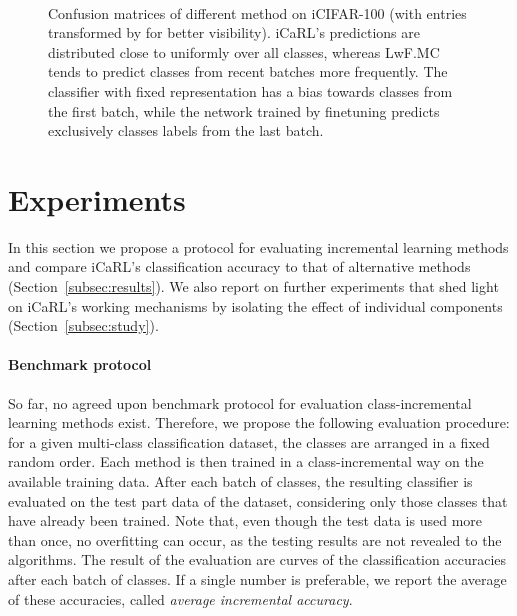 \documentclass[10pt,twocolumn,letterpaper]{article}
\begin{document}
\begin{figure*}[t]
\centering
{}\qquad 
{}
\\
\qquad
{}
\caption{Confusion matrices of different method on iCIFAR-100 (with entries transformed by  
for better visibility). 
iCaRL's predictions are distributed close to uniformly over all classes, 
whereas LwF.MC tends to predict classes from recent batches more 
frequently. 
The classifier with fixed representation has a bias towards classes from 
the first batch, while the network trained by finetuning predicts exclusively 
classes labels from the last batch.
}\label{fig:confusionmatrices}
\end{figure*}

\section{Experiments}\label{sec:experiments}
In this section we propose a protocol for evaluating 
incremental learning methods and compare iCaRL's classification 
accuracy to that of alternative methods (Section~\ref{subsec:results}). 
We also report on further experiments that shed light on iCaRL's 
working mechanisms by isolating the effect of individual components 
(Section~\ref{subsec:study}).

\paragraph{Benchmark protocol\onedot}
So far, no agreed upon benchmark protocol for evaluation 
class-incremental learning methods exist. Therefore, we 
propose the following evaluation procedure: 
for a given multi-class classification dataset, the classes are 
arranged in a fixed random order. Each method is then trained in 
a class-incremental way on the available training data. 
After each batch of classes, the resulting classifier is evaluated 
on the test part data of the dataset, considering only those classes 
that have already been trained. Note that, even though the test data 
is used more than once, no overfitting can occur, as the testing 
results are not revealed to the algorithms. 
The result of the evaluation are curves of the classification 
accuracies after each batch of classes. 
If a single number is preferable, we report the average of 
these accuracies, called \emph{average incremental accuracy}.
\end{document}
